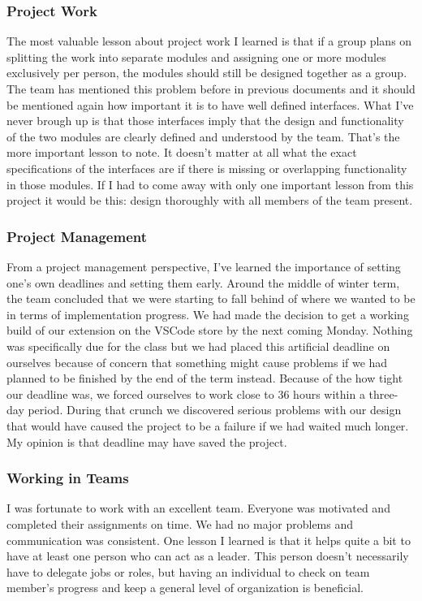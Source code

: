\documentclass[letterpaper,10pt,titlepage,draftclsnofoot,onecolumn,onesided] {IEEEtran}
\begin{document}
\subsubsection{Project Work}
The most valuable lesson about project work I learned is that if a group plans on splitting the work into separate modules and assigning one or more modules exclusively per person, the modules should still be designed together as a group. 
The team has mentioned this problem before in previous documents and it should be mentioned again how important it is to have well defined interfaces. 
What I've never brough up is that those interfaces imply that the design and functionality of the two modules are clearly defined and understood by the team.
That's the more important lesson to note. 
It doesn't matter at all what the exact specifications of the interfaces are if there is missing or overlapping functionality in those modules. 
If I had to come away with only one important lesson from this project it would be this: design thoroughly with all members of the team present.

\subsubsection{Project Management}
From a project management perspective, I've learned the importance of setting one's own deadlines and setting them early. 
Around the middle of winter term, the team concluded that we were starting to fall behind of where we wanted to be in terms of implementation progress. 
We had made the decision to get a working build of our extension on the VSCode store by the next coming Monday. 
Nothing was specifically due for the class but we had placed this artificial deadline on ourselves because of concern that something might cause problems if we had planned to be finished by the end of the term instead. 
Because of the how tight our deadline was, we forced ourselves to work close to 36 hours within a three-day period. 
During that crunch we discovered serious problems with our design that would have caused the project to be a failure if we had waited much longer.
My opinion is that deadline may have saved the project.

\subsubsection{Working in Teams}
I was fortunate to work with an excellent team. 
Everyone was motivated and completed their assignments on time. 
We had no major problems and communication was consistent. 
One lesson I learned is that it helps quite a bit to have at least one person who can act as a leader. 
This person doesn't necessarily have to delegate jobs or roles, but having an individual to check on team member's progress and keep a general level of organization is beneficial. 
\end{document}
